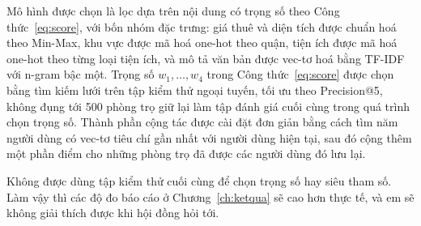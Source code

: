 Mô hình được chọn là lọc dựa trên nội dung có trọng số theo
Công thức~\eqref{eq:score}, với bốn nhóm đặc trưng: giá thuê và diện tích
được chuẩn hoá theo Min-Max, khu vực được mã hoá one-hot theo quận, tiện
ích được mã hoá one-hot theo từng loại tiện ích, và mô tả văn bản được
vec-tơ hoá bằng TF-IDF với n-gram bậc một. Trọng số $w_1, \dots, w_4$ trong
Công thức~\eqref{eq:score} được chọn bằng tìm kiếm lưới trên tập kiểm thử
ngoại tuyến, tối ưu theo Precision@5, không đụng tới 500 phòng trọ giữ lại
làm tập đánh giá cuối cùng trong quá trình chọn trọng số. Thành phần cộng
tác được cài đặt đơn giản bằng cách tìm năm người dùng có vec-tơ tiêu chí
gần nhất với người dùng hiện tại, sau đó cộng thêm một phần điểm cho những
phòng trọ đã được các người dùng đó lưu lại.

\begin{luuy}
Không được dùng tập kiểm thử cuối cùng để chọn trọng số hay siêu tham số.
Làm vậy thì các độ đo báo cáo ở Chương~\ref{ch:ketqua} sẽ cao hơn thực tế,
và em sẽ không giải thích được khi hội đồng hỏi tới.
\end{luuy}
